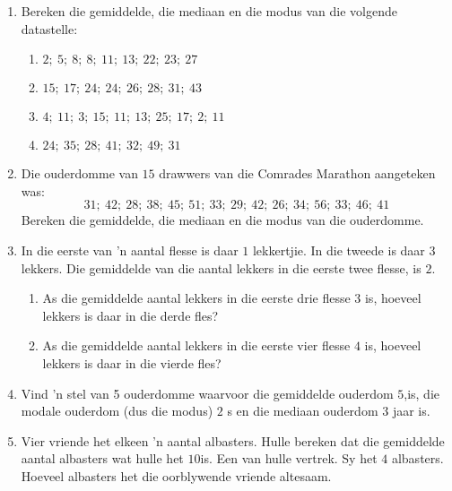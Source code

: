 \begin{exercises}{}{
    \begin{enumerate}[noitemsep, label=\textbf{\arabic*}.]
    \item Bereken die gemiddelde, die mediaan en die modus van die volgende datastelle:
      \begin{enumerate}[noitemsep, label=\textbf{(\alph*)} ]
      \item $2;~5;~8;~8;~11;~13;~22;~23;~27$
      \item $15;~17;~24;~24;~26;~28;~31;~43$
      \item $4;~11;~3;~15;~11;~13;~25;~17;~2;~11$
      \item $24;~35;~28;~41;~32;~49;~31$
      \end{enumerate}
    \item Die ouderdomme van $15$ drawwers van die  Comrades Marathon aangeteken was:
      \begin{equation*}
        31;~42;~28;~38;~45;~51;~33;~29;~42;~26;~34;~56;~33;~46;~41
      \end{equation*}
      Bereken die gemiddelde, die mediaan en die modus van die ouderdomme.
    \item In die eerste van ’n aantal flesse is daar $1$ lekkertjie. In die tweede is daar $3$ lekkers. Die gemiddelde van die aantal lekkers in die eerste twee flesse, is $2$.
      \begin{enumerate}[noitemsep, label=\textbf{(\alph*)} ]
      \item As die gemiddelde aantal lekkers in die eerste drie flesse $3$ is, hoeveel lekkers is daar in die derde fles?
      \item As die gemiddelde aantal lekkers in die eerste vier flesse $4$ is, hoeveel lekkers is daar in die vierde fles?
      \end{enumerate}
    \item Vind ’n stel van 5 ouderdomme waarvoor die gemiddelde ouderdom $5$,is, die modale ouderdom (dus die modus) $2$ s en die mediaan ouderdom $3$ jaar is.
    \item Vier vriende het elkeen ’n aantal albasters. Hulle bereken dat die gemiddelde aantal albasters wat hulle het $10$is. Een van hulle vertrek. Sy het $4$ albasters. Hoeveel albasters het die oorblywende vriende altesaam. 
    \end{enumerate}
}
\end{exercises}

